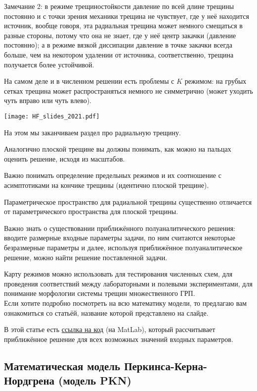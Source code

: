 \documentclass[main.tex]{subfiles}
\begin{document}
Замечание 2: в режиме трещиностойкости давление по всей длине трещины постоянно и с точки зрения механики трещина не чувствует, где у неё находится источник, вообще говоря, эта радиальная трещина может немного смещаться в разные стороны, потому что она не знает, где у неё центр закачки (давление постоянно);
а в режиме вязкой диссипации давление в точке закачки всегда больше, чем на некотором удалении от источника, соответственно, трещина получается более устойчивой.

На самом деле и в численном решении есть проблемы с $K$ режимом: на грубых сетках трещина может распространяться немного не симметрично (может уходить чуть вправо или чуть влево).

\texttt{[image: HF\_slides\_2021.pdf]}

На этом мы заканчиваем раздел про радиальную трещину.

Аналогично плоской трещине вы должны понимать, как можно на пальцах оценить решение, исходя из масштабов.

Важно понимать определение предельных режимов и их соотношение с асимптотиками на кончике трещины (идентично плоской трещине).

Параметрическое пространство для радиальной трещины существенно отличается от параметрического пространства для плоской трещины.

Важно знать о существовании приближённого полуаналитического решения:
вводите размерные входные параметры задачи, по ним считаются некоторые безразмерные параметры и далее, используя приближённое полуаналитическое решение, можно найти решение поставленной задачи.

Карту режимов можно использовать для тестирования численных схем, для проведения соответствий между лабораторными и полевыми экспериментами, для понимание морфологии системы трещин множественного ГРП.
\\

Если хотите подробно посмотреть на всю математику модели, то предлагаю вам ознакомиться со статьёй, название которой представлено на слайде.

В этой статье есть \href{https://datadryad.org/stash/dataset/doi:10.5061/dryad.gh469}{ссылка на код} (на MatLab), который рассчитывает приближённое решение для всех возможных значений входных параметров. 

\subsection{Математическая модель Перкинса-Керна-Нордгрена (модель PKN)}
\end{document}
